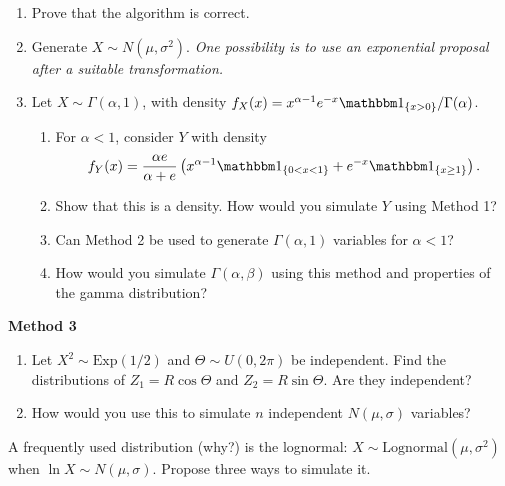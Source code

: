 \documentclass[a4paper]{report}
\begin{document}
\begin{problem}
\begin{enumerate}
\item Prove that the algorithm is correct.
\item Generate $X\sim N(\mu,\sigma^2)$. \emph{One possibility is to use an exponential proposal after a suitable transformation.}
\item Let $X\sim\Gamma(\alpha,1)$, with density $f_X(x)=x^{\alpha-1}e^{-x}\mathbbm1_{\{x>0\}}/\Gamma(\alpha)$.
\begin{enumerate}
\item For $\alpha<1$, consider $Y$ with density
\[f_Y(x)=\frac{\alpha e}{\alpha+e}\left(x^{\alpha-1}\mathbbm1_{\{0<x<1\}}+e^{-x}\mathbbm1_{\{x\geq1\}}\right).\]
\item Show that this is a density. How would you simulate $Y$ using Method 1?
\item Can Method 2 be used to generate $\Gamma(\alpha,1)$ variables for $\alpha<1$?
\item How would you simulate $\Gamma(\alpha,\beta)$ using this method and properties of the gamma distribution?
\end{enumerate}
\end{enumerate}
\textbf{Method 3}
\begin{enumerate}
\item Let $X^2\sim\mathrm{Exp}(1/2)$ and $\Theta\sim U(0,2\pi)$ be independent. Find the distributions of $Z_1=R\cos\Theta$ and $Z_2=R\sin\Theta$. Are they independent?
\item How would you use this to simulate $n$ independent $N(\mu,\sigma)$ variables?
\end{enumerate}
A frequently used distribution (why?) is the lognormal: $X\sim\mathrm{Lognormal}(\mu,\sigma^2)$ when $\ln X\sim N(\mu,\sigma)$. Propose three ways to simulate it.
\end{problem}
\end{document}
